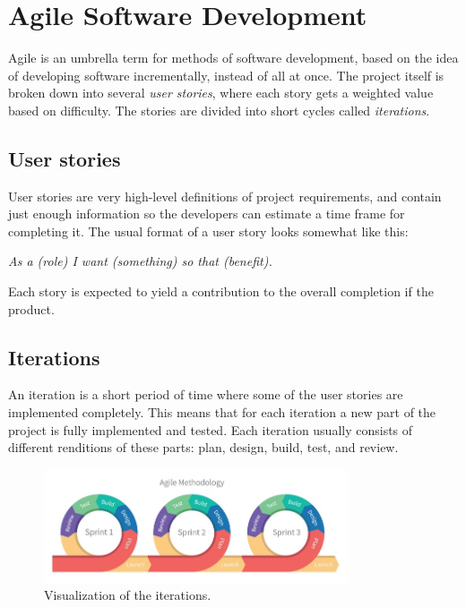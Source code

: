     
\section{Agile Software Development} \label{Agile}
\vspace{-5mm}
Agile is an umbrella term for methods of software development, based on the idea of developing software incrementally, instead of all at once. The project itself is broken down into several \textit{user stories}, where each story gets a weighted value based on difficulty. The stories are divided into short cycles called \textit{iterations}.\cite{agile:nutshell}

\subsection{User stories}
\vspace{-5mm}
User stories are very high-level definitions of project requirements, and contain just enough information so the developers can estimate a time frame for completing it. The usual format of a user story looks somewhat like this:
\vspace{-5mm}
\begin{center}
	\textit{As a (role) I want (something) so that (benefit).}
\end{center}
\vspace{-5mm}
Each story is expected to yield a contribution to the overall completion if the product.\cite{agile:modeling}

\pagebreak
\subsection{Iterations}\label{iter}\vspace{-5mm}
An iteration is a short period of time where some of the user stories are implemented completely. This means that for each iteration a new part of the project is fully implemented and tested. Each iteration usually consists of different renditions of these parts: plan, design, build, test, and review. 
\begin{figure}[H]
	\centering
	\includegraphics[trim={0 0 0 0},clip,width=0.8\textwidth]{Files/agile.jpg}
	\caption{Visualization of the iterations\cite{agile:figure}.}
	\label{fig: MVC}
\end{figure}

